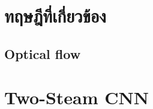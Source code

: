 \clearpage
%
%
%

\section{ทฤษฎีที่เกี่ยวข้อง}
\subsection{Optical flow}


\clearpage
\section{Two-Steam CNN}





